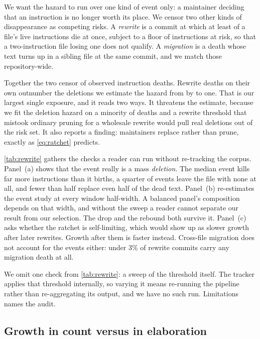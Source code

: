 
We want the hazard to run over one kind of event only: a maintainer deciding that an instruction is
no longer worth its place. We censor two other kinds of disappearance as competing risks. A
\emph{rewrite} is a commit at which at least \RewriteFracThreshold{} of a file's live instructions
die at once, subject to a floor of \RewriteMinDirectives{} instructions at risk, so that a
two-instruction file losing one does not qualify. A \emph{migration} is a death whose text turns up
in a sibling file at the same commit, and we match those repository-wide.

Together the two censor \FieldCensoredDeathShare{} of observed instruction deaths. Rewrite deaths
on their own outnumber the deletions we estimate the hazard from by
\FieldRewriteToDeletionRatio{} to one. That is our largest single exposure, and it reads two ways.
It threatens the estimate, because we fit the deletion hazard on a minority of deaths and a rewrite
threshold that mistook ordinary pruning for a wholesale rewrite would pull real deletions out of
the risk set. It also reports a finding: maintainers replace rather than prune, exactly as
\autoref{eq:ratchet} predicts.

\autoref{tab:rewrite} gathers the checks a reader can run without re-tracking the corpus.
Panel~(a) shows that the event really is a mass \emph{deletion}. The median event kills far more
instructions than it births, a quarter of events leave the file with none at all, and fewer than
half replace even half of the dead text. Panel~(b) re-estimates the event study at every window
half-width. A balanced panel's composition depends on that width, and without the sweep a reader
cannot separate our result from our selection. The drop and the rebound both survive it. Panel~(c)
asks whether the ratchet is self-limiting, which would show up as slower growth after later
rewrites. Growth after them is faster instead. Cross-file migration does not account for the events
either: under 3\% of rewrite commits carry any migration death at all.

We omit one check from \autoref{tab:rewrite}: a sweep of the \RewriteFracThreshold{} threshold
itself. The tracker applies that threshold internally, so varying it means re-running the pipeline
rather than re-aggregating its output, and we have no such run. Limitations names the audit.

\subsection{Growth in count versus in elaboration}
\label{sec:appendix:decomposition}

